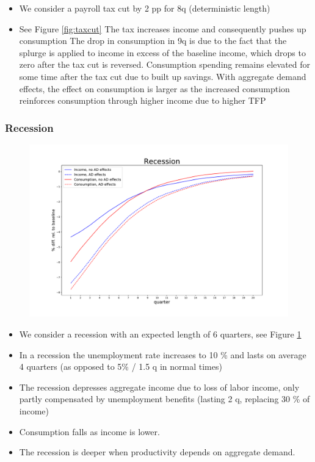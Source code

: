 \documentclass[]{article}
\begin{document}
\begin{itemize}
	\item We consider a payroll tax cut by 2 pp for 8q (deterministic length)
	\item See Figure \ref{fig:taxcut}
	\subitem The tax increases income and consequently pushes up consumption
	\subitem The drop in consumption in 9q is due to the fact that the splurge is applied to income in excess of the baseline income, which drops to zero after the tax cut is reversed. Consumption spending remains elevated for some time after the tax cut due to built up savings. 
	\subitem With aggregate demand effects, the effect on consumption is larger as the increased consumption reinforces consumption through higher income due to higher TFP	
\end{itemize}

\FloatBarrier
\subsubsection{Recession}

\begin{figure}
	\centering
	\includegraphics[width=\linewidth]{../full_run/recession}
	\caption{}
	\label{fig:recession}
\end{figure}


\begin{itemize}
	\item We consider a recession with an expected length of 6 quarters, see Figure \ref{fig:recession}
	\item In a recession the unemployment rate increases to 10 \% and lasts on average 4 quarters (as opposed to 5\% / 1.5 q in normal times)
	\item The recession depresses aggregate income due to loss of labor income, only partly compensated by unemployment benefits (lasting 2 q, replacing 30 \% of income)
	\item Consumption falls as income is lower.
	\item The recession is deeper when productivity depends on aggregate demand.
\end{itemize}
\end{document}
